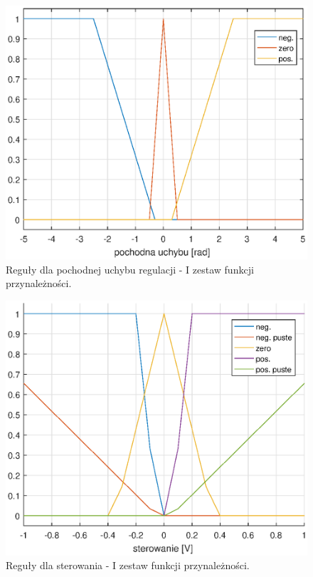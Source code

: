 \begin{figure}[h!]
	\centering
	\includegraphics[scale = 0.6]{fig/de_rules.eps}
	\caption		
	{Reguły dla pochodnej uchybu regulacji - I zestaw funkcji przynależności.}
	\label{de_rules1}
\end{figure}


\begin{figure}[h!]
	\centering
	\includegraphics[scale = 0.6]{fig/u_rules.eps}
	\caption		
	{Reguły dla sterowania -  I zestaw funkcji przynależności.}
	\label{u_rules1}
\end{figure}

